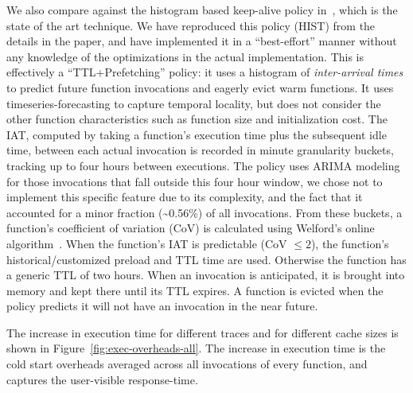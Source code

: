 We also compare against the histogram based keep-alive policy in~\cite{shahrad_serverless_2020}, which is the state of the art technique.
We have reproduced this policy (HIST) from the details in the paper, and have implemented it in a ``best-effort'' manner without any knowledge of the optimizations in the actual implementation.
This is effectively a ``TTL+Prefetching'' policy: it uses a histogram of \emph{inter-arrival times} to predict future function invocations and eagerly evict warm functions.
It uses timeseries-forecasting to capture temporal locality, but does not consider the other function characteristics such as function size and initialization cost. 
The IAT, computed by taking a function's execution time plus the subsequent idle time, between each actual invocation is recorded in minute granularity buckets, tracking up to four hours between executions.
The policy uses ARIMA modeling for those invocations that fall outside this four hour window, we chose not to implement this specific feature due to its complexity, and the fact that it accounted for a minor fraction (\textasciitilde 0.56\%) of all invocations.
From these buckets, a function's coefficient of variation (CoV) is calculated using Welford's online algorithm~\cite{welford}. 
When the function's IAT is predictable (CoV $\leq 2$), the function's historical/customized preload and TTL time are used. Otherwise the function has a generic TTL of two hours. 
When an invocation is anticipated, it is brought into memory and kept there until its TTL expires.
A function is evicted when the policy predicts it will not have an invocation in the near future. 


%
The increase in execution time for different traces and for different cache sizes is shown in Figure~\ref{fig:exec-overheads-all}.
The increase in execution time is the cold start overheads averaged across all invocations of every function, and captures the user-visible response-time. 
%

